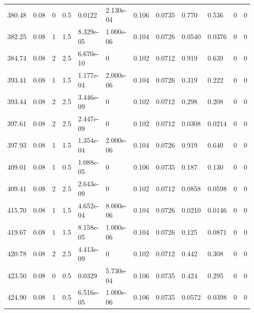 \documentclass[preview]{standalone}
\begin{document}
{{{\begin{tabular}{L{1.2cm}C{1.2cm} C{0.3cm}C{0.5cm} C{1.4cm}C{1.4cm} C{1.4cm}C{1.4cm} C{1.6cm}C{1.6cm} C{1.6cm}C{1.6cm}}
  380.48  &  0.08  & 0     & 0.5 &  0.0122  & 2.130e-04  &  0.106&   0.0735& 0.770 & 0.536   &  0 & 0  \\ 
  382.25  &  0.08  & 1     & 1.5 &  8.329e-05  & 1.000e-06  &  0.104&   0.0726& 0.0540 & 0.0376   &  0 & 0  \\ 
  384.74  &  0.08  & 2     & 2.5 &  6.670e-10  & 0  &  0.102&   0.0712& 0.919 & 0.639   &  0 & 0  \\ 
  393.41  &  0.08  & 1     & 1.5 &  1.177e-04  & 2.000e-06  &  0.104&   0.0726& 0.319 & 0.222   &  0 & 0  \\ 
  393.44  &  0.08  & 2     & 2.5 &  3.446e-09  & 0  &  0.102&   0.0712& 0.298 & 0.208   &  0 & 0  \\ 
  397.61  &  0.08  & 2     & 2.5 &  2.447e-09  & 0  &  0.102&   0.0712& 0.0308 & 0.0214   &  0 & 0  \\ 
  397.93  &  0.08  & 1     & 1.5 &  1.354e-04  & 2.000e-06  &  0.104&   0.0726& 0.919 & 0.640   &  0 & 0  \\ 
  409.01  &  0.08  & 1     & 0.5 &  1.088e-05  & 0  &  0.106&   0.0735& 0.187 & 0.130   &  0 & 0  \\ 
  409.41  &  0.08  & 2     & 2.5 &  2.643e-09  & 0  &  0.102&   0.0712& 0.0858 & 0.0598   &  0 & 0  \\ 
  415.70  &  0.08  & 1     & 1.5 &  4.652e-04  & 8.000e-06  &  0.104&   0.0726& 0.0210 & 0.0146   &  0 & 0  \\ 
  419.67  &  0.08  & 1     & 1.5 &  8.158e-05  & 1.000e-06  &  0.104&   0.0726& 0.125 & 0.0871   &  0 & 0  \\ 
  420.78  &  0.08  & 2     & 2.5 &  4.413e-09  & 0  &  0.102&   0.0712& 0.442 & 0.308   &  0 & 0  \\ 
  423.50  &  0.08  & 0     & 0.5 &  0.0329  & 5.730e-04  &  0.106&   0.0735& 0.424 & 0.295   &  0 & 0  \\ 
  424.90  &  0.08  & 1     & 0.5 &  6.516e-05  & 1.000e-06  &  0.106&   0.0735& 0.0572 & 0.0398   &  0 & 0  \\ 
\hline 
\end{tabular} 

}}}
\end{document}

